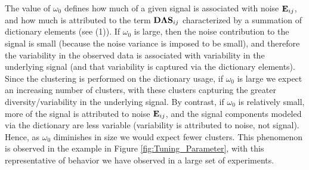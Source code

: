 \documentclass[journal]{IEEEtran}
\begin{document}
The value of $\omega_0$ defines how much of a given signal is associated with noise ${\mathbf E}_{ij}$, and how much is attributed to the term ${\mathbf D}\boldsymbol{\Lambda}{\mathbf S}_{ij}$ characterized by a summation of dictionary elements (see (1)). If $\omega_0$ is large, then the noise contribution to the signal is small (because the noise variance is imposed to be small), and therefore the variability in the observed data is associated with variability in the underlying signal (and that variability is captured via the dictionary elements). Since the clustering is performed on the dictionary usage, if $\omega_0$ is large we expect an increasing number of clusters, with these clusters capturing the greater diversity/variability in the underlying signal. By contrast, if $\omega_0$ is relatively small, more of the signal is attributed to noise ${\mathbf E}_{ij}$, and the signal components modeled via the dictionary are less variable (variability is attributed to noise, not signal). Hence, as $\omega_0$ diminishes in size we would expect fewer clusters. This phenomenon is observed in the example in Figure \ref{fig:Tuning_Parameter}, with this representative of behavior we have observed in a large set of experiments.
\end{document}
